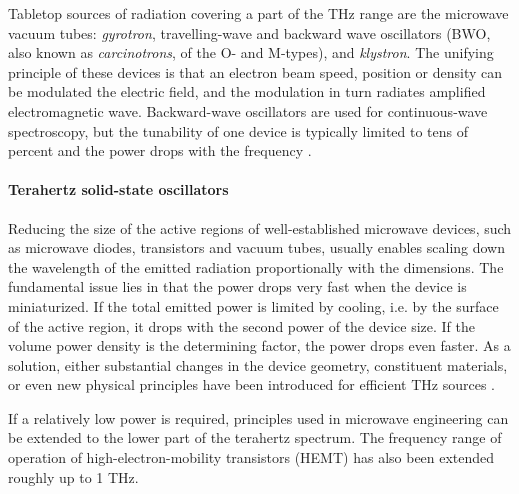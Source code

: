 Tabletop sources of radiation covering a part of the THz range are the microwave vacuum tubes: \textit{gyrotron}, travelling-wave and backward wave oscillators (BWO, also known as \textit{carcinotrons}, of the O- and M-types), and \textit{klystron}. The unifying principle of these devices is that an electron beam speed, position or density can be modulated the electric field, and the modulation in turn radiates amplified electromagnetic wave. Backward-wave oscillators are 
used for continuous-wave spectroscopy, but the tunability of one device is typically limited to tens of percent and the power drops with the frequency \cite{lewis2014review}.

\paragraph{Terahertz solid-state oscillators}%
Reducing the size of the active regions of well-established microwave devices, such as microwave diodes, transistors and vacuum tubes, usually enables scaling down the wavelength of the emitted radiation proportionally with the dimensions. 
The fundamental issue lies in that the power drops very fast when the device is miniaturized. If the total emitted power is limited by cooling, i.e. by the surface of the active region, it drops with the second power of the device size. If the volume power density is the determining factor, the power drops even faster.  %
As a solution, either substantial changes in the device geometry, constituent materials, or even new physical principles have been introduced for efficient THz sources \cite[pp. 8-12]{sullivan2012field}.  


If a relatively low power is required, principles used in microwave engineering can be extended to the lower part of the terahertz spectrum.  %
The frequency range of operation of high-electron-mobility transistors (HEMT) has also been extended roughly up to 1 THz. %


